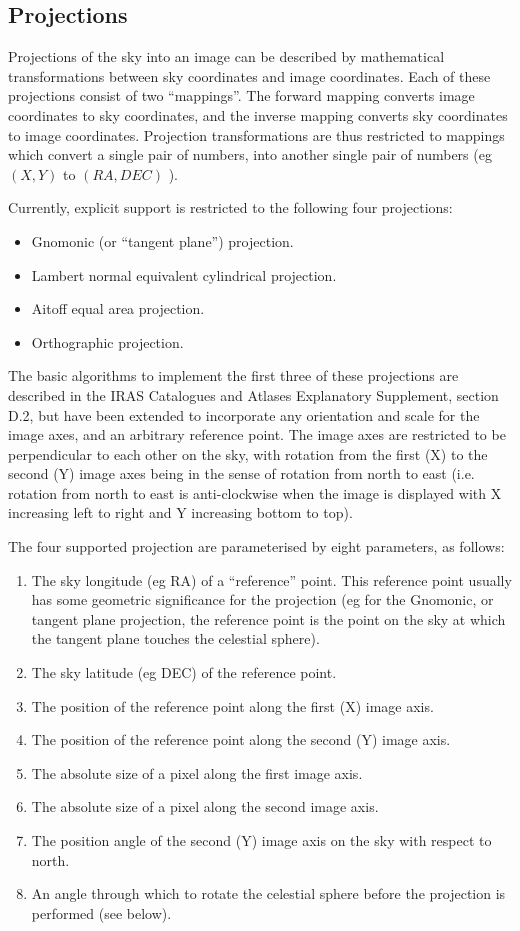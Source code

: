 \subsection {Projections}
\label {SEC:PARS}
Projections of the sky into an image can be described by mathematical
transformations between sky coordinates and image coordinates. Each of these
projections consist of two ``mappings''. The forward mapping converts image
coordinates to sky coordinates, and the inverse mapping converts sky coordinates
to image coordinates. Projection transformations are thus restricted to mappings
which convert a single pair of numbers, into another single pair of numbers (eg
$(X,Y)$ to $(RA,DEC)$ ).

Currently, explicit support is restricted to the following four projections:
\begin {itemize}
\item Gnomonic (or ``tangent plane'') projection.
\item Lambert normal equivalent cylindrical projection.
\item Aitoff equal area projection.
\item Orthographic projection.
\end {itemize}
The basic algorithms to implement the first three of these projections are
described in the IRAS Catalogues and Atlases Explanatory Supplement, section
D.2, but have been extended to incorporate any orientation and scale for the
image axes, and an arbitrary reference point. The image axes are restricted to
be perpendicular to each other on the sky, with rotation from the first (X) to
the second (Y) image axes being in the sense of rotation from north to east
(i.e. rotation from north to east is anti-clockwise when the image is displayed
with X increasing left to right and Y increasing bottom to top).

The four supported projection are parameterised by eight parameters, as
follows:
\begin {enumerate}
\item The sky longitude (eg RA) of a ``reference'' point. This reference point
usually has some geometric significance for the projection (eg for the Gnomonic,
or tangent plane projection, the reference point is the point on the sky at
which the tangent plane touches the celestial sphere).
\item The sky latitude (eg DEC) of the reference point.
\item The position of the reference point along the first (X) image axis.
\item The position of the reference point along the second (Y) image axis.
\item The absolute size of a pixel along the first image axis.
\item The absolute size of a pixel along the second image axis.
\item The position angle of the second (Y) image axis on the sky with respect to
north.
\item An angle through which to rotate the celestial sphere before the
projection is performed (see below).
\end {enumerate}

